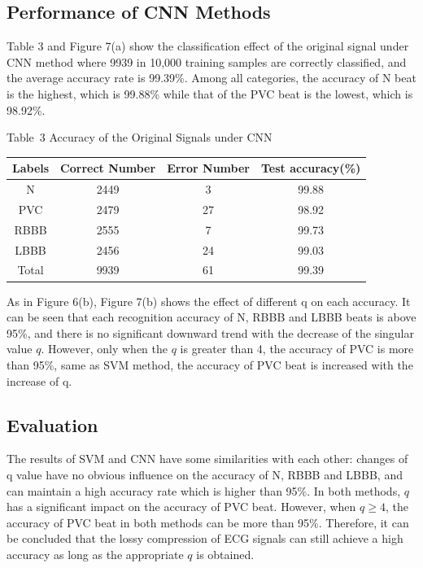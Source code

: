 \documentclass[journal]{IEEEtran}
\begin{document}
\subsection{Performance of CNN Methods}
Table 3 and Figure 7(a) show the classification effect of the original signal under CNN method where 9939 in 10,000 training samples are correctly classified, and the average accuracy rate is 99.39\%. Among all categories, the accuracy of N beat is the highest, which is 99.88\% while that of  the PVC beat is the lowest, which is 98.92\%.

 \begin{center}
 \scriptsize
 { Table~3 Accuracy of the Original Signals under CNN}\\
 \label{tab:3} \vskip 3pt
 \begin{tabular}{c|cc|c}
  \toprule
 Labels & Correct Number & Error Number & Test accuracy(\%)  \\
  \midrule
N    & 2449 & 3  & 99.88    \\
PVC  & 2479 & 27 & 98.92  \\
RBBB & 2555 & 7 & 99.73  \\
LBBB & 2456 & 24  & 99.03  \\
  \midrule
Total& 9939 & 61 & 99.39  \\
  \bottomrule
 \end{tabular}
\end{center}

As in Figure 6(b), Figure 7(b) shows the effect of different q on each accuracy. It can be seen that each recognition accuracy of N, RBBB and LBBB beats is above 95\%, and there is no significant downward trend with the decrease of the singular value $q$. However, only when the $q$ is greater than 4, the accuracy of PVC is more than 95\%, same as SVM method, the accuracy of PVC beat is increased with the increase of q.

\subsection{Evaluation}
The results of SVM and CNN have some similarities with each other: changes of q value have no obvious influence on the accuracy of N, RBBB and LBBB, and can maintain a high accuracy rate which is higher than 95\%. In both methods, $q$ has a significant impact on the accuracy of PVC beat. However, when $q\geq4$, the accuracy of PVC beat in both methods can be more than 95\%. Therefore, it can be concluded that the lossy compression of ECG signals can still achieve a high accuracy as long as  the appropriate $q$ is obtained.
\end{document}
